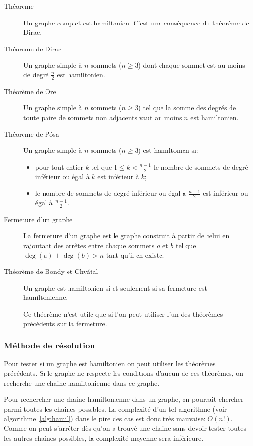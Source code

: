     \begin{description}
      \item[Théorème] Un graphe complet est hamiltonien. C'est une conséquence
        du théorème de Dirac.
      \item[Théorème de Dirac] Un graphe simple à $n$ sommets ($n \ge 3$) dont
        chaque sommet est au moins de degré $\frac{n}{2}$ est hamiltonien.
      \item[Théorème de Ore] Un graphe simple à $n$ sommets ($n \ge 3$) tel que
        la somme des degrés de toute paire de sommets non adjacents vaut au
        moins $n$ est hamiltonien.
      \item[Théorème de Pósa] Un graphe simple à $n$ sommets ($n \ge 3$) est
        hamiltonien si:
        \begin{itemize}
          \item pour tout entier $k$ tel que $1 \le k < \frac{n-1}{2}$ le
            nombre de sommets de degré inférieur ou égal à $k$ est inférieur à
            $k$;
          \item le nombre de sommets de degré inférieur ou égal à
            $\frac{n-1}{2}$ est inférieur ou égal à $\frac{n-1}{2}$.
        \end{itemize}
      \item[Fermeture d'un graphe] La fermeture d'un graphe est le graphe
        construit à partir de celui en rajoutant des arrêtes entre chaque
        sommets $a$ et $b$ tel que $\deg(a)+\deg(b) > n$ tant qu'il en existe.
      \item[Théorème de Bondy et Chvátal] Un graphe est hamiltonien si et
        seulement si sa fermeture est hamiltonienne.

        Ce théorème n'est utile que si l'on peut utiliser l'un des théorèmes
        précédents sur la fermeture.
    \end{description}

  \subsubsection{Méthode de résolution}
    Pour tester si un graphe est hamiltonien on peut utiliser les théorèmes
    précédents. Si le graphe ne respecte les conditions d'aucun de ces
    théorèmes, on recherche une chaine hamiltonienne dans ce graphe.

    Pour rechercher une chaine hamiltonienne dans un graphe, on pourrait
    chercher parmi toutes les chaines possibles. La complexité d'un tel
    algorithme (voir algorithme~\ref{alg:hamil}) dans le pire des cas est donc
    très mauvaise: $O(n!)$. Comme on peut s'arrêter dès qu'on a trouvé une
    chaine sans devoir tester toutes les autres chaines possibles, la
    complexité moyenne sera inférieure.

